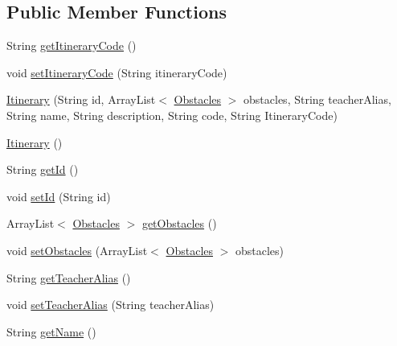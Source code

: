 \subsection*{Public Member Functions}
\begin{DoxyCompactItemize}
\item 
String \mbox{\hyperlink{classcom_1_1osoc_1_1oncera_1_1javabean_1_1_itinerary_a5644267241274ffb948741d264321858}{get\+Itinerary\+Code}} ()
\item 
void \mbox{\hyperlink{classcom_1_1osoc_1_1oncera_1_1javabean_1_1_itinerary_ae91f4be9a89e6889d27fbc45c30c15f6}{set\+Itinerary\+Code}} (String itinerary\+Code)
\item 
\mbox{\hyperlink{classcom_1_1osoc_1_1oncera_1_1javabean_1_1_itinerary_a37a7c3895c1735d1cd951b97c1c88a7f}{Itinerary}} (String id, Array\+List$<$ \mbox{\hyperlink{classcom_1_1osoc_1_1oncera_1_1javabean_1_1_obstacles}{Obstacles}} $>$ obstacles, String teacher\+Alias, String name, String description, String code, String Itinerary\+Code)
\item 
\mbox{\hyperlink{classcom_1_1osoc_1_1oncera_1_1javabean_1_1_itinerary_a02131939c835249427ea4cd9c5831711}{Itinerary}} ()
\item 
String \mbox{\hyperlink{classcom_1_1osoc_1_1oncera_1_1javabean_1_1_itinerary_abe055b6032bdb53cfc64c07635bd3ab9}{get\+Id}} ()
\item 
void \mbox{\hyperlink{classcom_1_1osoc_1_1oncera_1_1javabean_1_1_itinerary_abcace8fc1e9e905eae70596c9c88ed36}{set\+Id}} (String id)
\item 
Array\+List$<$ \mbox{\hyperlink{classcom_1_1osoc_1_1oncera_1_1javabean_1_1_obstacles}{Obstacles}} $>$ \mbox{\hyperlink{classcom_1_1osoc_1_1oncera_1_1javabean_1_1_itinerary_a07e2a3d18430562e03992499aa8eb474}{get\+Obstacles}} ()
\item 
void \mbox{\hyperlink{classcom_1_1osoc_1_1oncera_1_1javabean_1_1_itinerary_a8f7d431455457502873ac8d74d6eb67c}{set\+Obstacles}} (Array\+List$<$ \mbox{\hyperlink{classcom_1_1osoc_1_1oncera_1_1javabean_1_1_obstacles}{Obstacles}} $>$ obstacles)
\item 
String \mbox{\hyperlink{classcom_1_1osoc_1_1oncera_1_1javabean_1_1_itinerary_a2c1dbde9f97eb5f81c3ad4af074ffe6f}{get\+Teacher\+Alias}} ()
\item 
void \mbox{\hyperlink{classcom_1_1osoc_1_1oncera_1_1javabean_1_1_itinerary_a2196c734d56ebdc429cb19788f8f0c34}{set\+Teacher\+Alias}} (String teacher\+Alias)
\item 
String \mbox{\hyperlink{classcom_1_1osoc_1_1oncera_1_1javabean_1_1_itinerary_a80eb878d2ffc4d442d56cdad3554b18b}{get\+Name}} ()

\end{DoxyCompactItemize}
